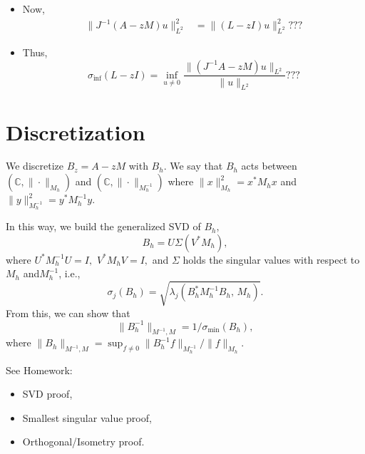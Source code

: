 \documentclass[12pt,a4paper]{article}
\theoremstyle{boldthm}
\theoremstyle{bolddefn}
\begin{document}
\begin{itemize}


\item Now, 
\begin{align}
    \|J^{-1}(A-zM)u\|_{L^2}^2 
    &= \| (L-zI) u \|_{L^2}^2  ???
\end{align}

\item Thus,
\begin{equation}
    \sigma_{\inf}(L-zI) = \inf_{u \ne 0} \frac{\|(J^{-1} A-zM)u \|_{L^2}}{\|u\|_{L^2}} ???
\end{equation}

\end{itemize}


\section{Discretization}

We discretize $B_z = A-zM$ with $B_h.$ We say that $B_h$ acts between $(\mathbb{C}, \| \cdot \|_{M_h})$ and $(\mathbb{C}, \| \cdot \|_{M_h^{-1}})$
where $\|x\|_{M_h}^2 = x^*M_h x$ and $\|y\|_{M_h^{-1}}^2 = y^*M_h^{-1} y.$

In this way, we build the generalized SVD of $B_h,$
\begin{equation}
    B_h = U \Sigma (V^* M_h),
\end{equation}
where $U^* M_h^{-1} U = I,$ $V^* M_h V = I,$ and $\Sigma$ holds the singular values with respect to $M_h$ and$ M_h^{-1}$, i.e.,
\begin{equation}
    \sigma_j(B_h)  = \sqrt{\lambda_j(B_h^* M_h^{-1} B_h, \, M_h)}.
\end{equation}
From this, we can show that 
\begin{equation}
    \| B_h^{-1} \|_{M^{-1}, M} = 1/\sigma_{\min}(B_h),
\end{equation}
 where $\|B_h\|_{M^{-1}, M} = \sup_{f \ne 0} \| B_h^{-1} f \|_{M_h^{-1}} / \|f \|_{M_h}.$


 \noindent
See Homework:
\begin{itemize}
    \item SVD proof,
    \item Smallest singular value proof,
    \item Orthogonal/Isometry proof.
\end{itemize}
\end{document}

